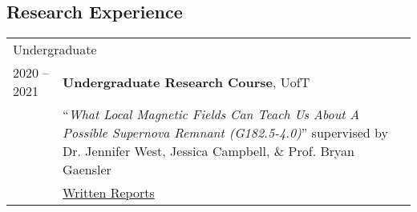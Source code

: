 \documentclass[10pt]{res} %
\begin{document}
\begin{resume}




\section{\Large Research Experience}
\vspace{-5pt} %
\noindent\makebox[\linewidth]{\rule{\textwidth}{0.4pt}}
\vspace{-20pt} %

\begin{table}[h!]
\begin{tabularx}{\textwidth}{ @{} p{6.5em} X @{} }
\multicolumn{2}{l}{ \rule{0pt}{3ex} \large \hspace{-12pt} Undergraduate \dotfill \rule[-1.2ex]{0pt}{0pt}} \\ 
2020 -- 2021 & \textbf{Undergraduate Research Course}, UofT \\
                     & ``\textit{What Local Magnetic Fields Can Teach Us About A Possible Supernova Remnant (G182.5-4.0)}'' supervised by Dr. Jennifer West, Jessica Campbell, $\&$ Prof. Bryan Gaensler \\
                     & \href{https://github.com/parampreetastro/AST425}{Written Reports}
\end{tabularx}
\end{table}




\end{resume}
\end{document}
